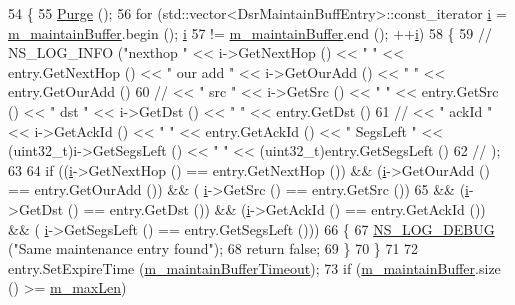 \begin{DoxyCode}
54 \{
55   \hyperlink{classns3_1_1dsr_1_1DsrMaintainBuffer_af12ee29b56abcaac29b60c0a544494b9}{Purge} ();
56   \textcolor{keywordflow}{for} (std::vector<DsrMaintainBuffEntry>::const\_iterator \hyperlink{bernuolliDistribution_8m_a6f6ccfcf58b31cb6412107d9d5281426}{i} = \hyperlink{classns3_1_1dsr_1_1DsrMaintainBuffer_a942fc86793c5a6f538a9f0bd69709ce9}{m\_maintainBuffer}.begin (); 
      \hyperlink{bernuolliDistribution_8m_a6f6ccfcf58b31cb6412107d9d5281426}{i}
57        != \hyperlink{classns3_1_1dsr_1_1DsrMaintainBuffer_a942fc86793c5a6f538a9f0bd69709ce9}{m\_maintainBuffer}.end (); ++\hyperlink{bernuolliDistribution_8m_a6f6ccfcf58b31cb6412107d9d5281426}{i})
58     \{
59 \textcolor{comment}{//      NS\_LOG\_INFO ("nexthop " << i->GetNextHop () << " " << entry.GetNextHop () << " our add " <<
       i->GetOurAdd () << " " << entry.GetOurAdd ()}
60 \textcolor{comment}{//                              << " src " << i->GetSrc () << " " << entry.GetSrc () << " dst " <<
       i->GetDst () << " " << entry.GetDst ()}
61 \textcolor{comment}{//                              << " ackId " << i->GetAckId () << " " << entry.GetAckId () << " SegsLeft "
       << (uint32\_t)i->GetSegsLeft () << " " << (uint32\_t)entry.GetSegsLeft ()}
62 \textcolor{comment}{//                   );}
63 
64       \textcolor{keywordflow}{if} ((\hyperlink{bernuolliDistribution_8m_a6f6ccfcf58b31cb6412107d9d5281426}{i}->GetNextHop () == entry.GetNextHop ()) && (\hyperlink{bernuolliDistribution_8m_a6f6ccfcf58b31cb6412107d9d5281426}{i}->GetOurAdd () == entry.GetOurAdd ()) && (
      \hyperlink{bernuolliDistribution_8m_a6f6ccfcf58b31cb6412107d9d5281426}{i}->GetSrc () == entry.GetSrc ())
65           && (\hyperlink{bernuolliDistribution_8m_a6f6ccfcf58b31cb6412107d9d5281426}{i}->GetDst () == entry.GetDst ()) && (\hyperlink{bernuolliDistribution_8m_a6f6ccfcf58b31cb6412107d9d5281426}{i}->GetAckId () == entry.GetAckId ()) && (
      \hyperlink{bernuolliDistribution_8m_a6f6ccfcf58b31cb6412107d9d5281426}{i}->GetSegsLeft () == entry.GetSegsLeft ()))
66         \{
67           \hyperlink{group__logging_ga413f1886406d49f59a6a0a89b77b4d0a}{NS\_LOG\_DEBUG} (\textcolor{stringliteral}{"Same maintenance entry found"});
68           \textcolor{keywordflow}{return} \textcolor{keyword}{false};
69         \}
70     \}
71 
72   entry.SetExpireTime (\hyperlink{classns3_1_1dsr_1_1DsrMaintainBuffer_a054cbdee77cd0a61520726c2fc72912c}{m\_maintainBufferTimeout});
73   \textcolor{keywordflow}{if} (\hyperlink{classns3_1_1dsr_1_1DsrMaintainBuffer_a942fc86793c5a6f538a9f0bd69709ce9}{m\_maintainBuffer}.size () >= \hyperlink{classns3_1_1dsr_1_1DsrMaintainBuffer_a497cea8ef3a7d5ee9db88e8cc0b8a365}{m\_maxLen})

\end{DoxyCode}
